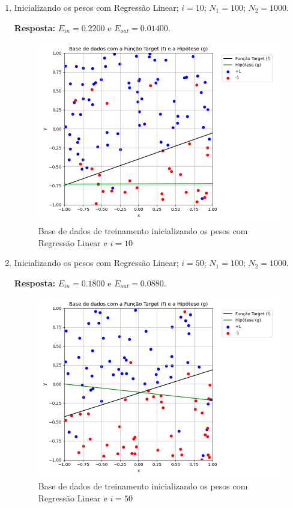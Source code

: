 \begin{enumerate}
\begin{enumerate}
        \item Inicializando os pesos com Regressão Linear; $i = 10$; $N_1 = 100$; $N_2 = 1000$.
        
        \textbf{Resposta:} $E_{in} = 0.2200$ e $E_{out} = 0.01400$.

        \begin{figure}[H]
            \caption{Base de dados de treinamento inicializando os pesos com Regressão Linear e $i = 10$}
               \centering
               \includegraphics[width=12cm]{pocket_i10_reglin.png}
        \end{figure}

        \item Inicializando os pesos com Regressão Linear; $i = 50$; $N_1 = 100$; $N_2 = 1000$.

        \textbf{Resposta:} $E_{in} = 0.1800$ e $E_{out} = 0.0880$.

        \begin{figure}[H]
            \caption{Base de dados de treinamento inicializando os pesos com Regressão Linear e $i = 50$}
               \centering
               \includegraphics[width=12cm]{pocket_i50_reglin.png}
        \end{figure}


\end{enumerate}
\end{enumerate}
